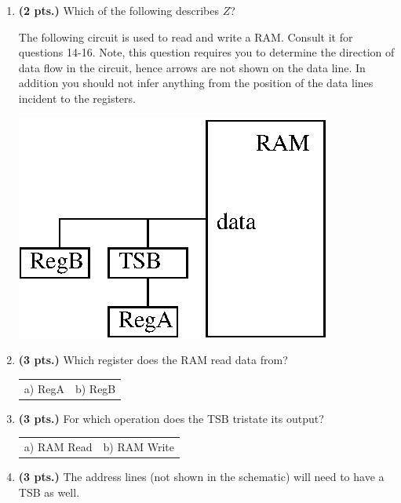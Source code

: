 \documentclass{article}
\begin{document}
\begin{enumerate}
\item {\bf (2 pts.)} Which of the following describes $Z$?


\pagebreak
The following circuit is used to read and write a RAM.
Consult it for questions 14-16.  Note, this question
requires you to determine the direction of data flow in 
the circuit, hence arrows are not shown on the data line.
In addition you should not infer anything from the position
of the data lines incident to the registers.

\includegraphics{./Fig3/ramtsb}

\item {\bf (3 pts.)} 
Which register does the RAM read data from?

\begin{tabular}{p{1.75in}p{1.75in}}
a) RegA & b) RegB \\
\end{tabular}


\item {\bf (3 pts.)} 
For which operation does the TSB tristate its output?

\begin{tabular}{p{1.75in}p{1.75in}}
a) RAM Read & b) RAM Write \\
\end{tabular}


\item {\bf (3 pts.)} 
The address lines (not shown in the schematic) will need to 
have a TSB as well.


\end{enumerate}
\end{document}
